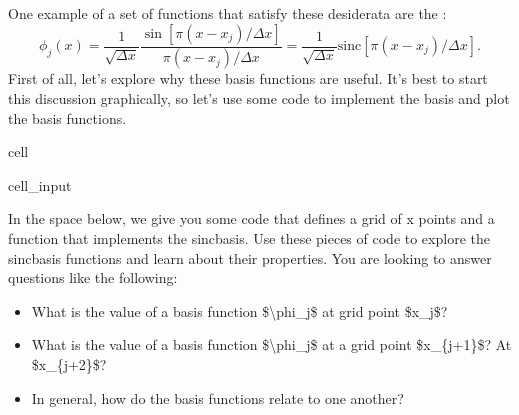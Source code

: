 \documentclass[letterpaper,10pt,english]{jupyterBook}
\begin{document}
\sphinxAtStartPar
One example of a set of functions that satisfy these desiderata are the :
\label{equation:Section4_v2:80aa6e3c-bbf0-496b-82c8-0d0abc89c53e}\begin{equation}
\phi_j(x) = \frac{1}{\sqrt{\Delta x}} \frac{\sin[\pi (x-x_j)/\Delta x]}{\pi (x-x_j)/\Delta x} = \frac{1}{\sqrt{\Delta x}} \text{sinc} [\pi (x-x_j)/\Delta x].
\end{equation}
\sphinxAtStartPar
First of all, let’s explore why these basis functions are useful. It’s best to start this discussion graphically, so let’s use some code to implement the basis and plot the basis functions.

\begin{sphinxuseclass}{cell}\begin{sphinxVerbatimInput}

\begin{sphinxuseclass}{cell_input}
\begin{sphinxVerbatim}[commandchars=\\\{\}]
   
   
\end{sphinxVerbatim}

\end{sphinxuseclass}\end{sphinxVerbatimInput}

\end{sphinxuseclass}
\sphinxAtStartPar
In the space below, we give you some code that defines a grid of x points and a function that implements the sinc\sphinxhyphen{}basis. Use these pieces of code to explore the sinc\sphinxhyphen{}basis functions and learn about their properties. You are looking to answer questions like the following:
\begin{itemize}
\item {} 
\sphinxAtStartPar
What is the value of a basis function \$\textbackslash{}phi\_j\$ at grid point \$x\_j\$?

\item {} 
\sphinxAtStartPar
What is the value of a basis function \$\textbackslash{}phi\_j\$ at a grid point \$x\_\{j+1\}\$? At \$x\_\{j+2\}\$?

\item {} 
\sphinxAtStartPar
In general, how do the basis functions relate to one another?

\end{itemize}
\end{document}
